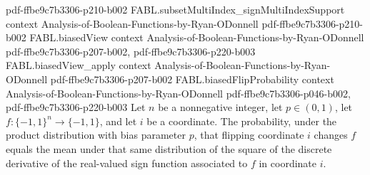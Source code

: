 \begin{theorem}
  {pdf-ffbe9c7b3306-p210-b002}
\proofstep
  {FABL.subsetMultiIndex_signMultiIndexSupport}
  {context}
  {Analysis-of-Boolean-Functions-by-Ryan-ODonnell}
  {pdf-ffbe9c7b3306-p210-b002}
\proofstep
  {FABL.biasedView}
  {context}
  {Analysis-of-Boolean-Functions-by-Ryan-ODonnell}
  {pdf-ffbe9c7b3306-p207-b002,
    pdf-ffbe9c7b3306-p220-b003}
\proofstep
  {FABL.biasedView_apply}
  {context}
  {Analysis-of-Boolean-Functions-by-Ryan-ODonnell}
  {pdf-ffbe9c7b3306-p207-b002}
\proofstep
  {FABL.biasedFlipProbability}
  {context}
  {Analysis-of-Boolean-Functions-by-Ryan-ODonnell}
  {pdf-ffbe9c7b3306-p046-b002,
    pdf-ffbe9c7b3306-p220-b003}
Let $n$ be a nonnegative integer, let $p\in(0,1)$, let $f:\{-1,1\}^n\to\{-1,1\}$, and
let $i$ be a coordinate. The probability, under the product distribution with bias
parameter $p$, that flipping coordinate $i$ changes $f$ equals the mean under that same
distribution of the square of the discrete derivative of the real-valued sign function
associated to $f$ in coordinate $i$.
\end{theorem}

